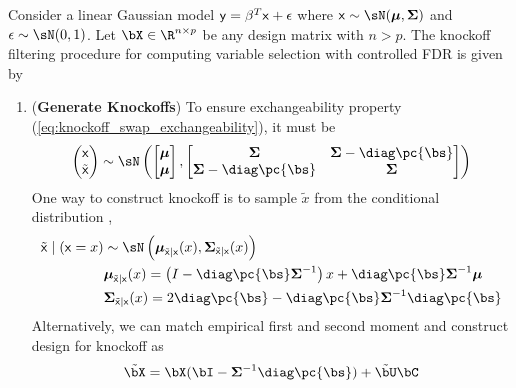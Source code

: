 \documentclass[11pt]{article}
\begin{document}
Consider a linear Gaussian model $\mathsf{y} = \beta^T\mathsf{x} + \epsilon$ where $\rx\sim\sN(\bmu,\bSigma)$ and $\epsilon\sim\sN(0,1)$. Let $\bX \in\R^{n\times p}$ be any design matrix with $n>p$. The knockoff filtering procedure for computing variable selection with controlled FDR is given by
\begin{enumerate}
    \item (\textbf{Generate Knockoffs}) 
    To ensure exchangeability property (\ref{eq:knockoff_swap_exchangeability}), it must be
    \begin{align*}
        \begin{pmatrix}
            \rx \\
            \tilde{\rx} 
        \end{pmatrix}            
            \sim \sN\left(
                \begin{bmatrix}
                    \bmu \\ 
                    \bmu \\
                \end{bmatrix}, 
                \begin{bmatrix}
                    \bSigma & \bSigma - \diag\pc{\bs} \\
                    \bSigma - \diag\pc{\bs} & \bSigma \\
                \end{bmatrix}\right)
    \end{align*}
    One way to construct knockoff is to sample $\tilde{x}$ from the conditional distribution \cite{candesPanningGoldModelX2017,gimenezKnockoffsMassNew2019},
    \begin{align*}
        \tilde{\rx} \mid (\rx = x)
            &\sim \sN\left(
                \bmu_{\tilde{\rx}|\rx}(x), \bSigma_{\tilde{\rx}|\rx}(x)
            \right) \\
        &\bmu_{\tilde{\rx}|\rx}(x) 
            = \left (I - \diag\pc{\bs}\bSigma^{-1}\right) x + \diag\pc{\bs}\bSigma^{-1} \bmu\\
        &\bSigma_{\tilde{\rx}|\rx}(x)
            = 2\diag\pc{\bs} - \diag\pc{\bs}\bSigma^{-1}\diag\pc{\bs}
    \end{align*}
    Alternatively, we can match empirical first and second moment \cite{barberControllingFalseDiscovery2015} and construct design for knockoff as 
    \begin{align*}
        \tilde{\bX}
            = \bX(\bI - \bSigma^{-1}\diag\pc{\bs}) + \tilde{\bU}\bC
    \end{align*}

\end{enumerate}
\end{document}
